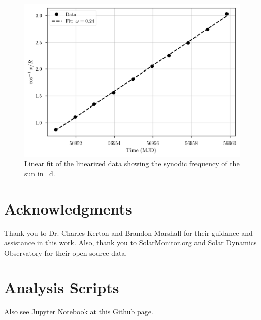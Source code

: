 \documentclass[%
aip,
jmp,
reprint,
floatfix,
]{revtex4-1}
\begin{document}
	\begin{figure}[t]
		\centering
		\includegraphics[width=.8\linewidth]{figs/fit.pdf}
		\caption{Linear fit of the linearized data showing the synodic frequency of the sun in \si{\per\day}.}
		\label{fig:line}
	\end{figure}


	



	\section*{Acknowledgments}

	Thank you to Dr. Charles Kerton and Brandon Marshall for their guidance and assistance in this work. Also, thank you to SolarMonitor.org and Solar Dynamics Observatory for their open source data.



	\onecolumngrid
	\appendix

	\section{Analysis Scripts} \label{sec:scripts}
	Also see Jupyter Notebook at \href{https://github.com/mileslucas/astro344l/blob/master/lab7/src/lab7.ipynb}{this Github page}.
	
	
	
\end{document}
